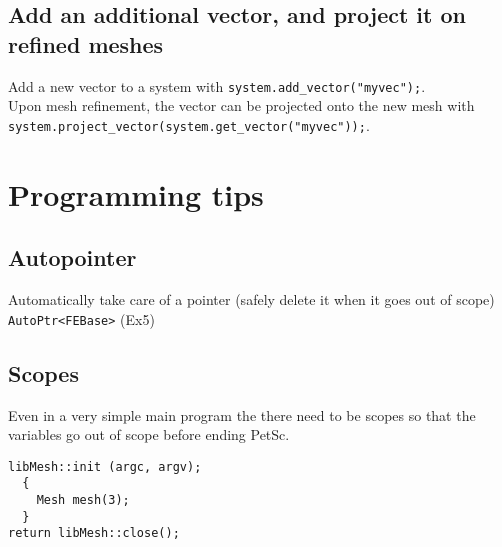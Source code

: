 \documentclass{article}
\newcommand{\exmp}[1]{\textsf{Ex#1}}
\newcommand{\code}[1]{\texttt{#1}}
\begin{document}
\subsection{Add an additional vector, and project it on refined meshes}
\label{sec:add_vector}

Add a new vector to a system with \code{system.add\_vector("myvec");}. \\ Upon
mesh refinement, the vector can be projected onto the new mesh with 
\code{system.project\_vector(system.get\_vector("myvec"));}.


\section{Programming tips}
\label{sec:programming-tips}

\subsection{Autopointer}
\label{sec:autopointer}

Automatically take care of a pointer (safely delete it when it goes out of
scope) \code{AutoPtr<FEBase>} (\exmp{5})

\subsection{Scopes}
\label{sec:scopes}

Even in a very simple main program the there need to be scopes so that
the variables go out of scope before ending PetSc.

\begin{lstlisting}
libMesh::init (argc, argv);
  { 
    Mesh mesh(3);
  } 
return libMesh::close();
\end{lstlisting}
\end{document}

